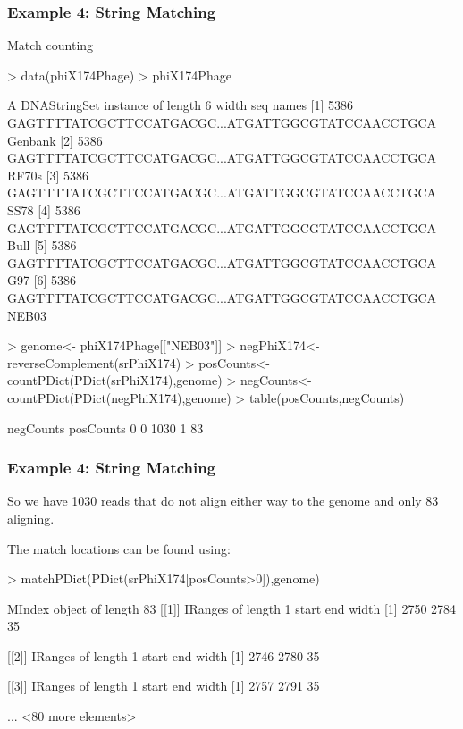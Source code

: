 \documentclass{beamer}
\begin{document}
\begin{frame}[fragile]
\frametitle{Example 4: String Matching}
  \bit
      \item Match counting
          \begin{uncoverenv}
\begin{Schunk}
\begin{Sinput}
> data(phiX174Phage)
> phiX174Phage
\end{Sinput}
\begin{Soutput}
  A DNAStringSet instance of length 6
    width seq                                               names               
[1]  5386 GAGTTTTATCGCTTCCATGACGC...ATGATTGGCGTATCCAACCTGCA Genbank
[2]  5386 GAGTTTTATCGCTTCCATGACGC...ATGATTGGCGTATCCAACCTGCA RF70s
[3]  5386 GAGTTTTATCGCTTCCATGACGC...ATGATTGGCGTATCCAACCTGCA SS78
[4]  5386 GAGTTTTATCGCTTCCATGACGC...ATGATTGGCGTATCCAACCTGCA Bull
[5]  5386 GAGTTTTATCGCTTCCATGACGC...ATGATTGGCGTATCCAACCTGCA G97
[6]  5386 GAGTTTTATCGCTTCCATGACGC...ATGATTGGCGTATCCAACCTGCA NEB03
\end{Soutput}
\begin{Sinput}
> genome<- phiX174Phage[["NEB03"]]
> negPhiX174<- reverseComplement(srPhiX174)
> posCounts<- countPDict(PDict(srPhiX174),genome)
> negCounts<- countPDict(PDict(negPhiX174),genome)
> table(posCounts,negCounts)
\end{Sinput}
\begin{Soutput}
         negCounts
posCounts    0
        0 1030
        1   83
\end{Soutput}
\end{Schunk}
          \end{uncoverenv}
  \eit
\end{frame}


\begin{frame}
\frametitle{Example 4: String Matching}
  \bit
      \item So we have 1030 reads that do not align either way to the genome and only 83 aligning.
      \item The match locations can be found using:
          \begin{uncoverenv}
\begin{Schunk}
\begin{Sinput}
> matchPDict(PDict(srPhiX174[posCounts>0]),genome)
\end{Sinput}
\begin{Soutput}
MIndex object of length 83
[[1]]
IRanges of length 1
    start  end width
[1]  2750 2784    35

[[2]]
IRanges of length 1
    start  end width
[1]  2746 2780    35

[[3]]
IRanges of length 1
    start  end width
[1]  2757 2791    35

...
<80 more elements>
\end{Soutput}
\end{Schunk}
          \end{uncoverenv}
  \eit
\end{frame}
\end{document}
